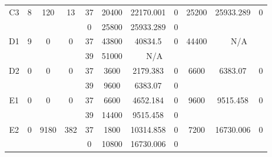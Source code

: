 \begin{sidewaystable}
\begin{tabular}{c||c|c|c||c|c|c|c||c|c|c}
         &
        
      \\
      \hline
      \multirow{2}{*}{C3} &
      \multirow{2}{*}{8} &
      \multirow{2}{*}{120} &
      \multirow{2}{*}{13} &
      37 &
      20400 &
        22170.001 &
        0 &
      \multirow{2}{*}{25200} &
        \multirow{2}{*}{25933.289} &
        \multirow{2}{*}{0}
      \\
      \cline{5-8}
       &
       &
       &
       &
      0 &
      25800 &
        25933.289 &
        0 &
      
         &
        
      \\
      \hline
      \multirow{2}{*}{D1} &
      \multirow{2}{*}{9} &
      \multirow{2}{*}{0} &
      \multirow{2}{*}{0} &
      37 &
      43800 &
        40834.5 &
        0 &
      \multirow{2}{*}{44400} &
        \multicolumn{2}{c}{\multirow{2}{*}{N/A}}
      \\
      \cline{5-8}
       &
       &
       &
       &
      39 &
      51000 &
        \multicolumn{2}{|c||}{N/A} &
      
        
      \\
      \hline
      \multirow{2}{*}{D2} &
      \multirow{2}{*}{0} &
      \multirow{2}{*}{0} &
      \multirow{2}{*}{0} &
      37 &
      3600 &
        2179.383 &
        0 &
      \multirow{2}{*}{6600} &
        \multirow{2}{*}{6383.07} &
        \multirow{2}{*}{0}
      \\
      \cline{5-8}
       &
       &
       &
       &
      39 &
      9600 &
        6383.07 &
        0 &
      
         &
        
      \\
      \hline
      \multirow{2}{*}{E1} &
      \multirow{2}{*}{0} &
      \multirow{2}{*}{0} &
      \multirow{2}{*}{0} &
      37 &
      6600 &
        4652.184 &
        0 &
      \multirow{2}{*}{9600} &
        \multirow{2}{*}{9515.458} &
        \multirow{2}{*}{0}
      \\
      \cline{5-8}
       &
       &
       &
       &
      39 &
      14400 &
        9515.458 &
        0 &
      
         &
        
      \\
      \hline
      \multirow{2}{*}{E2} &
      \multirow{2}{*}{0} &
      \multirow{2}{*}{9180} &
      \multirow{2}{*}{382} &
      37 &
      1800 &
        10314.858 &
        0 &
      \multirow{2}{*}{7200} &
        \multirow{2}{*}{16730.006} &
        \multirow{2}{*}{0}
      \\
      \cline{5-8}
       &
       &
       &
       &
      0 &
      10800 &
        16730.006 &
        0 &
      

\end{tabular}
\end{sidewaystable}
